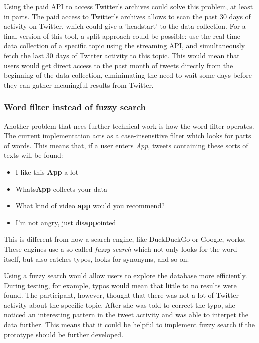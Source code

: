 Using the paid API to access Twitter's archives could solve this problem, at least in parts. The paid access to Twitter's archives allows to scan the past 30 days of activity on Twitter, which could give a 'headstart' to the data collection. For a final version of this tool, a split approach could be possible: use the real-time data collection of a specific topic using the streaming API, and simultaneously fetch the last 30 days of Twitter activity to this topic. This would mean that users would get direct access to the past month of tweets directly from the beginning of the data collection, elminimating the need to wait some days before they can gather meaningful results from Twitter.

\subsubsection*{Word filter instead of fuzzy search}
Another problem that nees further technical work is how the word filter operates. The current implementation acts as a case-insensitive filter which looks for parts of words. This means that, if a user enters \emph{App}, tweets containing these sorts of texts will be found:

\begin{itemize}
    \item I like this \textbf{App} a lot
    \item Whats\textbf{App} collects your data
    \item What kind of video \textbf{app} would you recommend?
    \item I'm not angry, just dis\textbf{app}ointed
\end{itemize}

This is different from how a search engine, like DuckDuckGo or Google, works. These engines use a so-called \emph{fuzzy search} which not only looks for the word itself, but also catches typos, looks for synonyms, and so on.

Using a fuzzy search would allow users to explore the database more efficiently. During testing, for example, typos would mean that little to no results were found. The participant, however, thought that there was not a lot of Twitter activity about the specific topic. After she was told to correct the typo, she noticed an interesting pattern in the tweet activity and was able to interpet the data further. This means that it could be helpful to implement fuzzy search if the prototype should be further developed.

